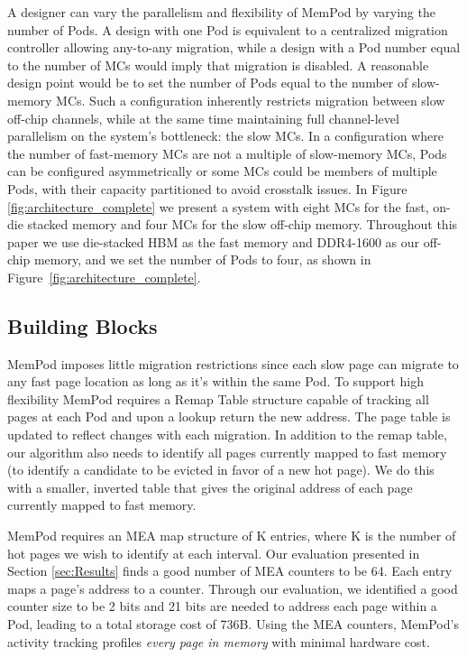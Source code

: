 A designer can vary the parallelism and flexibility of MemPod by varying the
number of Pods. A design with one Pod is equivalent to a centralized 
migration controller allowing any-to-any migration,
while a design with a Pod number equal to the number of MCs would imply that migration is disabled. A reasonable design point would be to set the number of Pods equal to the number of slow-memory MCs. Such a configuration inherently restricts migration between slow off-chip channels, while at the same time maintaining full channel-level parallelism on the system's bottleneck: the slow MCs. In a configuration where the number of fast-memory MCs are not a multiple of slow-memory MCs, Pods can be configured asymmetrically or some MCs could be members of multiple Pods, with their capacity partitioned to avoid crosstalk issues. In Figure \ref{fig:architecture_complete} we present a system with eight MCs for the fast, on-die stacked memory and four MCs for the slow off-chip memory. Throughout this paper we use die-stacked HBM as the fast memory \cite{JEDEC-HBM-REVISED} and DDR4-1600 as our off-chip memory, and 
we set the number of Pods to four, as shown in Figure~\ref{fig:architecture_complete}.

\subsection{Building Blocks}

MemPod imposes little migration restrictions since each slow page can migrate to any fast page location as long as it's within the same Pod. To support high flexibility MemPod requires a Remap Table structure capable of tracking all pages at each Pod and upon a lookup return the new address. The page table is updated to reflect changes with each migration. In addition to the remap table, our algorithm also needs to identify all pages currently mapped to fast memory (to identify a candidate to be evicted in favor of a new hot page). We do this with a smaller, inverted table that gives the original address of each page currently mapped to fast memory.

MemPod requires an MEA map structure of K entries, where K is the number of hot pages we wish to identify at each interval. Our evaluation presented in Section \ref{sec:Results} finds a good number of MEA counters to be 64. Each entry maps a page's address to a counter. Through our evaluation, we identified a good counter size to be 2 bits and 21 bits are needed to address each page within a Pod, leading to a total storage cost of 736B. Using the MEA counters, MemPod's activity tracking profiles \textit{every page in memory} with minimal hardware cost. 

